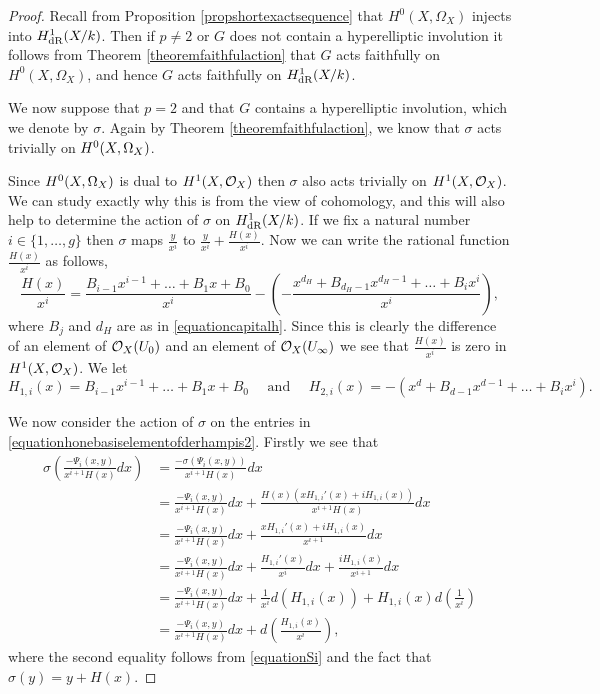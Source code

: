     \begin{proof}
    Recall from Proposition \ref{propshortexactsequence} that $H^0(X,\Omega_X)$ injects into $H_{\text {dR}}^1(X/k)$.
    Then if $p \neq 2$ or $G$ does not contain a hyperelliptic involution it follows from Theorem \ref{theoremfaithfulaction} that $G$ acts faithfully on $H^0(X,\Omega_X)$, and hence $G$ acts faithfully on $H_{\text {dR}}^1(X/k)$.
    
    We now suppose that $p=2$ and that $G$ contains a hyperelliptic involution, which we denote by $\sigma$.
    Again by Theorem \ref{theoremfaithfulaction}, we know that $\sigma$ acts trivially on ${H^0(X,\Omega_X)}$.
    
    Since ${H^0(X,\Omega_X)}$ is dual to $H^1(X,\mathcal{O}_X)$ then $\sigma$ also acts trivially on $H^1(X,\mathcal{O}_X)$.
    We can study exactly why this is from the view of \cech cohomology, and this will also help to determine the action of $\sigma$ on $H_{\text {dR}}^1(X/k)$.
    If we fix a natural number $i\in \{1, \ldots ,g\}$ then $\sigma$ maps $\frac{y}{x^i}$ to $\frac{y}{x^i} + \frac{H(x)}{x^i}$. 
    Now we can write the rational function $\frac{H(x)}{x^i}$ as follows, 
        \begin{equation*}
        \frac{H(x)}{x^i} =  \frac{B_{i-1}x^{i-1} + \ldots + B_1x + B_0}{x^i} - \left( - \frac{x^{d_H} + B_{d_H-1}x^{d_H-1} + \ldots + B_ix^i}{x^i} \right),
        \end{equation*}
    where $B_j$ and $d_H$ are as in \eqref{equationcapitalh}.
    Since this is clearly the difference of an element of ${\cal O}_X(U_0)$ and an element of ${\cal O}_X(U_\infty)$ we see that $\frac{H(x)}{x^i}$ is zero in $H^1(X,\mathcal{O}_X)$.
    We let 
        \[
        H_{1,i}(x) = B_{i-1}x^{i-1} + \ldots + B_1x + B_0 \quad \text{ and } \quad H_{2,i}(x) = -( x^d + B_{d-1}x^{d-1} + \ldots + B_ix^i).
        \]
    
    We now consider the action of $\sigma$ on the entries in \eqref{equationhonebasiselementofderhampis2}.
    Firstly we see that
        \begin{align*}
        \sigma \left( \frac{-\Psi_i(x,y)}{x^{i+1}H(x)} dx\right) & = \frac{-\sigma(\Psi_i(x,y))}{x^{i+1} H(x)} dx \\
        & = \frac{-\Psi_i(x,y)}{x^{i+1}H(x)}dx + \frac{H(x)(xH_{1,i}'(x) + iH_{1,i}(x))}{x^{i+1}H(x)}dx\\
        & = \frac{-\Psi_i(x,y)}{x^{i+1}H(x)}dx + \frac{xH_{1,i}'(x) + iH_{1,i}(x)}{x^{i+1}}dx \\
        & = \frac{-\Psi_i(x,y)}{x^{i+1}H(x)}dx +  \frac{H_{1,i}'(x)}{x^i}dx + \frac{iH_{1,i}(x)}{x^{i+1}}dx \\
        & = \frac{-\Psi_i(x,y)}{x^{i+1}H(x)}dx +  \frac{1}{x^i}d\left( H_{1,i}(x) \right) + H_{1,i}(x) d \left( \frac{1}{x^i} \right) \\
        & = \frac{-\Psi_i(x,y)}{x^{i+1}H(x)}dx + d\left( \frac{H_{1,i}(x)}{x^i} \right),
        \end{align*}
    where the second equality follows from \eqref{equationSi} and the fact that $\sigma(y) = y + H(x)$.
    

\end{proof}
